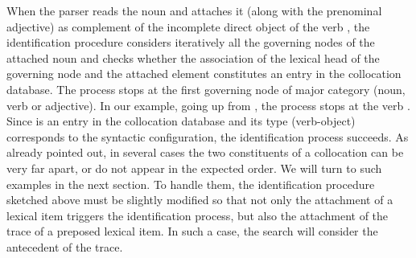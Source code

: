 \documentclass[output=paper]{langsci/langscibook}
\begin{document}
{{{When\ili{} the\ili{} parser\ili{} reads\ili{} the\ili{} noun\ili{} \ili{}\textit{}\ili{} and\ili{} attaches\ili{} it\ili{} \ili{}(along\ili{} with\ili{} the\ili{} prenominal\ili{} adjective\ili{})\ili{} as\ili{} complement\ili{} of\ili{} the\ili{} incomplete\ili{} \ili{} \ili{}\cat{}\ili{} direct\ili{} object\ili{} of\ili{} the\ili{} verb\ili{} \ili{}\textit{}\ili{},\ili{} the\ili{} identification\ili{} procedure\ili{} considers\ili{} iteratively\ili{} all\ili{} the\ili{} governing\ili{} nodes\ili{} of\ili{} the\ili{} attached\ili{} noun\ili{} and\ili{} checks\ili{} whether\ili{} the\ili{} association\ili{} of\ili{} the\ili{} lexical\ili{} head\ili{} of\ili{} the\ili{} governing\ili{} node\ili{} and\ili{} the\ili{} attached\ili{} element\ili{} constitutes\ili{} an\ili{} entry\ili{} in\ili{} the\ili{} collocation\ili{} database\ili{}.\ili{} The\ili{} process\ili{} stops\ili{} at\ili{} the\ili{} first\ili{} governing\ili{} node\ili{} of\ili{} major\ili{} category\ili{} \ili{}(noun\ili{},\ili{} verb\ili{} or\ili{} adjective\ili{})\ili{}.\ili{} In\ili{} our\ili{} example\ili{},\ili{} going\ili{} up\ili{} from\ili{} \ili{}\textit{}\ili{},\ili{} the\ili{} process\ili{} stops\ili{} at\ili{} the\ili{} verb\ili{} \ili{}\textit{}\ili{}.\ili{} Since\ili{} \ili{}\textit{}\ili{} is\ili{} an\ili{} entry\ili{} in\ili{} the\ili{} collocation\ili{} database\ili{} and\ili{} its\ili{} type\ili{} \ili{}(verb\ili{}-object\ili{})\ili{} corresponds\ili{} to\ili{} the\ili{} syntactic\ili{} configuration\ili{},\ili{} the\ili{} identification\ili{} process\ili{} succeeds\ili{}.\ili{}
\ili{}
As\ili{} already\ili{} pointed\ili{} out\ili{},\ili{} in\ili{} several\ili{} cases\ili{} the\ili{} two\ili{} constituents\ili{} of\ili{} a\ili{} collocation\ili{} can\ili{} be\ili{} very\ili{} far\ili{} apart\ili{},\ili{} or\ili{} do\ili{} not\ili{} appear\ili{} in\ili{} the\ili{} expected\ili{} order\ili{}.\ili{} We\ili{} will\ili{} turn\ili{} to\ili{} such\ili{} examples\ili{} in\ili{} the\ili{} next\ili{} section\ili{}.\ili{} To\ili{} handle\ili{} them\ili{},\ili{} the\ili{} identification\ili{} procedure\ili{} sketched\ili{} above\ili{} must\ili{} be\ili{} slightly\ili{} modified\ili{} so\ili{} that\ili{} not\ili{} only\ili{} the\ili{} attachment\ili{} of\ili{} a\ili{} lexical\ili{} item\ili{} triggers\ili{} the\ili{} identification\ili{} process\ili{},\ili{} but\ili{} also\ili{} the\ili{} attachment\ili{} of\ili{} the\ili{} trace\ili{} of\ili{} a\ili{} preposed\ili{} lexical\ili{} item\ili{}.\ili{} In\ili{} such\ili{} a\ili{} case\ili{},\ili{} the\ili{} search\ili{} will\ili{} consider\ili{} the\ili{} antecedent\ili{} of\ili{} the\ili{} trace\ili{}.\ili{} \ili{}
}}}
\end{document}
